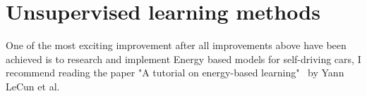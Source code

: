 \section{Unsupervised learning methods}
One of the most exciting improvement after all improvements above have been
achieved is to research and implement Energy based models for self-driving cars,
I recommend reading the paper "A tutorial on energy-based
learning"~\cite{Lecun98gradient-basedlearning} by Yann LeCun et al.